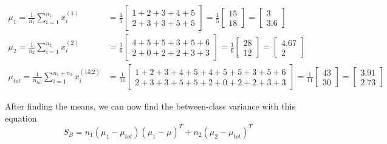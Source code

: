 \documentclass[12pt]{article}
\begin{document}
\begin{align}
    \mu_1 = \frac{1}{n_1}\sum_{i=1}^{n_1} x_i^{(1)} &= \frac{1}{5} 
    \begin{bmatrix}
        1 + 2 + 3 + 4 + 5 \\
        2 + 3 + 3 + 5 + 5
    \end{bmatrix} = \frac{1}{5}
    \begin{bmatrix}
        15 \\
        18
    \end{bmatrix} = 
    \begin{bmatrix}
        3 \\
        3.6
    \end{bmatrix} \\
    \mu_2 = \frac{1}{n_2} \sum_{i=1}^{n_2} x_i^{(2)} &= \frac{1}{6} 
    \begin{bmatrix}
        4 + 5+ 5 + 3 +5 + 6 \\
        2 + 0 + 2 + 2 + 3 + 3
    \end{bmatrix} = 
    \frac{1}{6}
    \begin{bmatrix}
        28 \\
        12
    \end{bmatrix} =
    \begin{bmatrix}
        4.67 \\
        2
    \end{bmatrix} \\
    \mu_{tot} = \frac{1}{n_{tot}} \sum_{i=1}^{n_1+n_2} x_i^{(1 \& 2)} &= \frac{1}{11}
    \begin{bmatrix}
         1 + 2 + 3 + 4 + 5 + 4 + 5+ 5 + 3 +5 + 6 \\
         2 + 3 + 3 + 5 + 5 + 2 + 0 + 2 + 2 + 3 + 3
    \end{bmatrix} = 
    \frac{1}{11} 
    \begin{bmatrix}
        43 \\
        30
    \end{bmatrix} =
    \begin{bmatrix}
        3.91 \\
        2.73
    \end{bmatrix}
\end{align}

After finding the means, we can now find the between-class variance with this equation
\begin{equation}
    S_B = n_1 (\mu_1 - \mu_{tot})(\mu_1 - \mu)^T + n_2(\mu_2 - \mu_{tot})^T
\end{equation}
\end{document}
